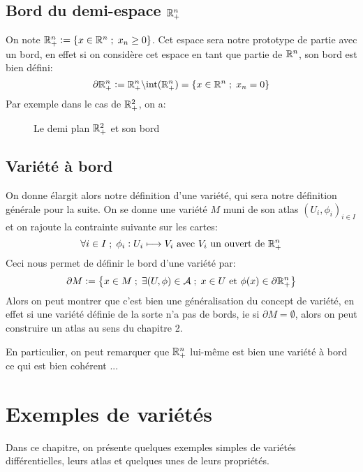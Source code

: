    \section{Bord du demi-espace \( \mathbb{R}^n_+ \)}
   On note \( \mathbb{R}^n_+ := \left\{ x \in \mathbb{R}^n  \; ; \; x_n \geq 0\right\} \). Cet espace sera notre prototype de partie avec un bord, en effet si on considère cet espace en tant que partie de \( \mathbb{R}^n \), son bord est bien défini:
   \[ 
      \partial \mathbb{R}^n_+ := \mathbb{R}^n_+ \backslash \text{int}(\mathbb{R}^n_+) = \left\{ x \in \mathbb{R}^n \; ; \; x_n = 0\right\}  
   \]
   Par exemple dans le cas de \( \mathbb{R}^2_+ \), on a:
      \begin{figure}[ht!]
         \centering
        \caption{Le demi plan \( \mathbb{R}^2_+ \) et son bord}
      \end{figure}
   \vspace{-15pt}
   \section{Variété à bord}
   On donne élargit alors notre définition d'une variété, qui sera notre définition générale pour la suite. On se donne une variété \( M \) muni de son atlas \( (U_i, \phi_i)_{i \in I} \) et on rajoute la contrainte suivante sur les cartes:
   \[ 
      \forall i \in I \; ; \; \phi_i : U_i \longmapsto V_i \text{ avec } V_i \text{ un ouvert de } \mathbb{R}^n_+
   \]
   Ceci nous permet de définir le bord d'une variété par:
   \[ 
      \partial M := \left\{ x \in M  \; ; \; \exists (U, \phi) \in \mathcal{A} \; ; \; x \in U \text{ et } \phi(x) \in \partial\mathbb{R}^n_+\right\}  
   \]
   Alors on peut montrer que c'est bien une généralisation du concept de variété, en effet si une variété définie de la sorte n'a pas de bords, ie si \( \partial M = \emptyset\), alors on peut construire un atlas au sens du chapitre 2.\<

   En particulier, on peut remarquer que \( \mathbb{R}^n_+ \) lui-même est bien une variété à bord ce qui est bien cohérent ...
\chapter{Exemples de variétés}
   Dans ce chapitre, on présente quelques exemples simples de variétés différentielles, leurs atlas et quelques unes de leurs propriétés.
